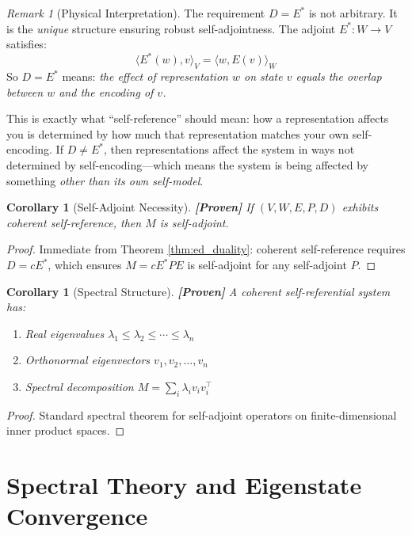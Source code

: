 \documentclass[11pt]{article}
\newtheorem{corollary}[theorem]{Corollary}
\theoremstyle{definition}
\theoremstyle{remark}
\newtheorem{remark}[theorem]{Remark}
\begin{document}
\begin{remark}[Physical Interpretation]
The requirement $D = E^*$ is not arbitrary. It is the \emph{unique} structure ensuring robust self-adjointness. The adjoint $E^* : W \to V$ satisfies:
\[
\langle E^*(w), v \rangle_V = \langle w, E(v) \rangle_W
\]
So $D = E^*$ means: \emph{the effect of representation $w$ on state $v$ equals the overlap between $w$ and the encoding of $v$.}

This is exactly what ``self-reference'' should mean: how a representation affects you is determined by how much that representation matches your own self-encoding. If $D \neq E^*$, then representations affect the system in ways not determined by self-encoding---which means the system is being affected by something \emph{other than its own self-model}.
\end{remark}

\begin{corollary}[Self-Adjoint Necessity]\label{cor:self_adjoint}
\textbf{[Proven]} If $(V, W, E, P, D)$ exhibits coherent self-reference, then $M$ is self-adjoint.
\end{corollary}

\begin{proof}
Immediate from Theorem \ref{thm:ed_duality}: coherent self-reference requires $D = cE^*$, which ensures $M = cE^*PE$ is self-adjoint for any self-adjoint $P$.
\end{proof}

\begin{corollary}[Spectral Structure]\label{cor:spectral}
\textbf{[Proven]} A coherent self-referential system has:
\begin{enumerate}[label=(\roman*)]
    \item Real eigenvalues $\lambda_1 \leq \lambda_2 \leq \cdots \leq \lambda_n$
    \item Orthonormal eigenvectors $v_1, v_2, \ldots, v_n$
    \item Spectral decomposition $M = \sum_i \lambda_i v_i v_i^\top$
\end{enumerate}
\end{corollary}

\begin{proof}
Standard spectral theorem for self-adjoint operators on finite-dimensional inner product spaces.
\end{proof}

\section{Spectral Theory and Eigenstate Convergence}
\end{document}
